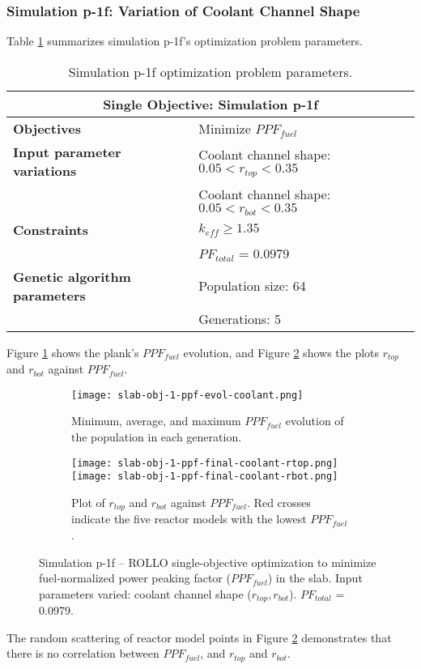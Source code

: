 \subsubsection{Simulation p-1f: Variation of Coolant Channel Shape}
Table \ref{tab:simulationp1f} summarizes simulation p-1f's optimization problem parameters. 
\begin{table}[htbp!]
    \centering
    \onehalfspacing
    \caption{Simulation p-1f optimization problem parameters.}
	\label{tab:simulationp1f}
    \footnotesize
    \begin{tabular}{l|p{6.5cm}}
    \hline 
    \multicolumn{2}{c}{\textbf{Single Objective: Simulation p-1f}} \\
    \hline 
    \textbf{Objectives} & Minimize $PPF_{fuel}$ \\
    \hline 
    \textbf{Input parameter variations} 
    & Coolant channel shape: $0.05<r_{top}<0.35$ \\
    & Coolant channel shape: $0.05<r_{bot}<0.35$ \\
    \hline
    \textbf{Constraints} & $k_{eff} \geq 1.35$\\ 
    & $PF_{total}$ = 0.0979\\
    \hline 
    \textbf{Genetic algorithm parameters} & Population size: 64 \\
    & Generations: 5 \\
    \hline
    \end{tabular}
\end{table}
Figure \ref{fig:slab-obj-1-ppf-evol-coolant} shows the plank's $PPF_{fuel}$ evolution, 
and Figure \ref{fig:slab-obj-1-ppf-final-coolant} shows the plots $r_{top}$ and 
$r_{bot}$ against $PPF_{fuel}$. 
\begin{figure}[htbp!]
    \centering
    \begin{subfigure}{\textwidth}
        \texttt{[image: slab-obj-1-ppf-evol-coolant.png]}
        \caption{Minimum, average, and maximum $PPF_{fuel}$ evolution of the 
        population in each generation.}
        \label{fig:slab-obj-1-ppf-evol-coolant} 
    \end{subfigure}
    \begin{subfigure}{\textwidth}
        \texttt{[image: slab-obj-1-ppf-final-coolant-rtop.png]}
        \texttt{[image: slab-obj-1-ppf-final-coolant-rbot.png]}
        \caption{Plot of $r_{top}$ and $r_{bot}$ against $PPF_{fuel}$. 
        Red crosses indicate the five reactor models with the lowest $PPF_{fuel}$.}
        \label{fig:slab-obj-1-ppf-final-coolant} 
    \end{subfigure}
    \caption{Simulation p-1f -- ROLLO single-objective optimization to minimize 
    fuel-normalized power peaking factor ($PPF_{fuel}$) in the slab. 
    Input parameters varied: coolant channel shape ($r_{top}, r_{bot}$). 
    $PF_{total}$ = 0.0979.}
    \label{fig:slab-obj-1-ppf-coolant}
\end{figure}
The random scattering of reactor model points in Figure 
\ref{fig:slab-obj-1-ppf-final-coolant} demonstrates that there is no correlation 
between $PPF_{fuel}$, and $r_{top}$ and $r_{bot}$. 

